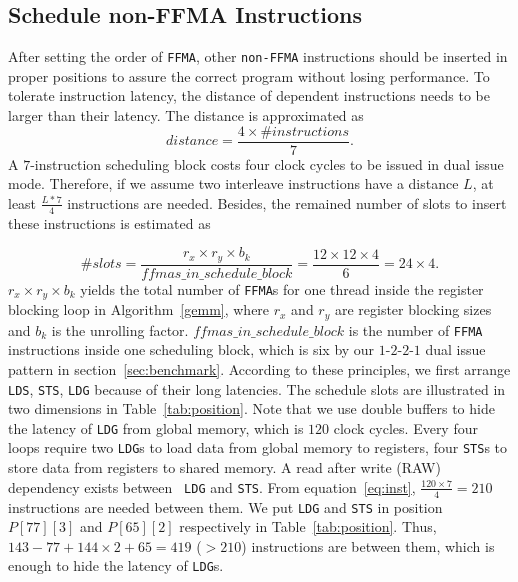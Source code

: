 \subsection{Schedule non-FFMA Instructions}
After setting the order of {\tt FFMA}, other {\tt non-FFMA} instructions should be inserted in proper positions to
assure the correct program without losing performance. To tolerate instruction latency, the
distance of dependent instructions needs to be larger than their latency. The distance is approximated as
{\footnotesize
\begin{equation}
\label{eq:inst}
distance = \frac{4\times\#instructions}{7}.
\end{equation}
}
A $7$-instruction scheduling block costs four clock cycles to be issued in dual issue mode.
Therefore, if we assume two interleave instructions have a distance $L$, at least $\frac{L*7}{4}$ instructions are needed.
Besides, the remained number of slots
to insert these instructions is estimated as

{\footnotesize
\begin{displaymath}
\#slots = \frac{r_x\times r_y\times b_k}{ffmas\_in\_schedule\_block}=\frac{12\times 12\times 4}{6}=24\times 4.
\end{displaymath}
}
$r_x\times r_y\times b_k$ yields the total number of {\tt FFMA}s for one thread inside the register blocking loop in Algorithm~\ref{gemm}, where $r_x$ and $r_y$ are register blocking sizes and $b_k$ is the unrolling factor.
$ffmas\_in\_schedule\_block$ is the number of {\tt FFMA} instructions inside one scheduling block, which is six by our
$1$-$2$-$2$-$1$ dual issue pattern in section~\ref{sec:benchmark}.
According to these principles, we first arrange {\tt LDS}, {\tt STS}, {\tt LDG} because of their long latencies. The
schedule slots are illustrated in two dimensions in Table~\ref{tab:position}.
Note that we use double buffers to hide the latency of {\tt LDG} from global memory, which is $120$ clock cycles.
Every four loops require two {\tt LDG}s to load data from global memory to registers, four {\tt STS}s to store data from
registers to shared memory. A read after write (RAW) dependency exists between {\tt
LDG} and {\tt STS}.
From equation~\ref{eq:inst}, $\frac{120\times 7}{4} = 210$ instructions are needed between them.
We put {\tt LDG} and  {\tt STS} in position $P[77][3]$ and $P[65][2]$ respectively in Table~\ref{tab:position}.
Thus, $143-77 + 144\times 2 + 65=419$ ($>210$) instructions are between them, which is enough to hide the latency of {\tt LDG}s.

